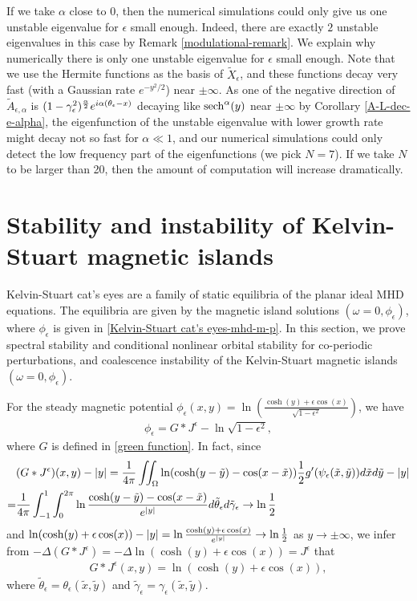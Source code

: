 \documentclass[1 [leqno, 11pt]{amsart}
\numberwithin{equation}{section}
\let\ep=\epsilon
\def\sech{{\rm{sech}}}
\begin{document}
\begin{CJK*}{GBK}{song}
If we take $\alpha$ close to $0$, then the numerical simulations could only give us one unstable eigenvalue for $\ep$ small enough. Indeed, there are exactly $2$  unstable eigenvalues in this case  by Remark \ref{modulational-remark}.
We explain why numerically there is only one unstable eigenvalue for $\ep$ small enough. Note that we use the Hermite functions as the basis of $\tilde X_\ep$, and these functions decay very fast (with a Gaussian rate $e^{-y^2/2}$) near $\pm\infty$.
As one of the negative direction of $\tilde A_{\ep,\alpha}$  is
$(1-\gamma_\ep^2)^{\alpha\over2}e^{i\alpha(\theta_\ep-x)}$ decaying like $\sech^{\alpha}(y)$ near $\pm\infty$ by Corollary
\ref{A-L-dec-e-alpha},
the eigenfunction of the unstable eigenvalue with lower growth rate might decay not so fast for $\alpha\ll1$, and our numerical simulations could only detect the low frequency part of the eigenfunctions (we pick $N=7$). If we take $N$ to be larger than 20, then the amount of computation will increase dramatically.

\section{Stability and instability of Kelvin-Stuart magnetic islands}\label{Stability and instability of magnetic islands0-sec}
Kelvin-Stuart cat's eyes are  a family of static equilibria of the planar ideal MHD equations.
 The equilibria are given by the magnetic island solutions $(\omega=0,\phi_{\ep})$, where $\phi_\ep$ is given in \eqref{Kelvin-Stuart cat's eyes-mhd-m-p}. In this section,  we prove  spectral stability and conditional  nonlinear orbital stability  for co-periodic perturbations, and coalescence instability of
 the Kelvin-Stuart magnetic islands $(\omega=0,\phi_{\ep})$.

 For the steady magnetic potential $\phi_{\ep}(x,y)=\ln \left(\frac{\cosh (y) + \epsilon \cos (x)}{\sqrt{1-\epsilon^2}} \right)$, we have
 \begin{align}\label{steady-mhd}
\phi_{\ep}=G*J^{\ep}-\ln\sqrt{1-\epsilon^2},
 \end{align}
 where $G$ is defined in \eqref{green function}.
 In fact, since
\begin{align*}
 &(G*J^{\ep})(x,y)-|y|={1\over 4\pi}\iint_{\Omega}\ln(\cosh(y-\tilde y)-\cos(x-\tilde x)){1\over 2}g'(\psi_\ep(\tilde x,\tilde y))d\tilde x d\tilde y-|y|\\
 =&
 {1\over 4\pi}\int_{-1}^1\int_0^{2\pi}\ln{\cosh(y-\tilde y)-\cos(x-\tilde x)\over e^{|y|}}d\tilde\theta_\ep d\tilde\gamma_{\ep}\to\ln{1\over2}
 \end{align*}
  and
  $\ln(\cosh(y)+\ep\cos(x))-|y|=\ln{\cosh(y)+\ep\cos(x)\over e^{|y|}}\to\ln{1\over2}$
  as $y\to\pm\infty$, we infer from $-\Delta(G*J^{\ep})=-\Delta\ln(\cosh(y)+\ep\cos(x))= J^{\ep}$ that
\begin{align*}
G*J^{\ep}(x,y)=\ln \left(\cosh (y) + \epsilon \cos (x) \right),
\end{align*}
where $\tilde\theta_\ep=\theta_\ep (\tilde x,\tilde y)$ and $\tilde \gamma_{\ep}=\gamma_{\ep}(\tilde x,\tilde y)$.

\end{CJK*}
\end{document}
